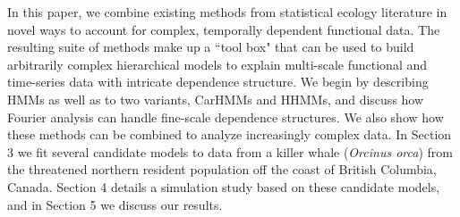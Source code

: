 In this paper, we combine existing methods from statistical ecology literature in novel ways to account for complex, temporally dependent functional data. The resulting suite of methods make up a ``tool box" that can be used to build arbitrarily complex hierarchical models to explain multi-scale functional and time-series data with intricate dependence structure.
We begin by describing HMMs as well as to two variants, CarHMMs and HHMMs, and discuss how Fourier analysis can handle fine-scale dependence structures. We also show how these methods can be combined to analyze increasingly complex data. In Section 3 we fit several candidate models to data from a killer whale (\textit{Orcinus orca}) from the threatened northern resident population off the coast of British Columbia, Canada. Section 4 details a simulation study based on these candidate models, and in Section 5 we discuss our results.